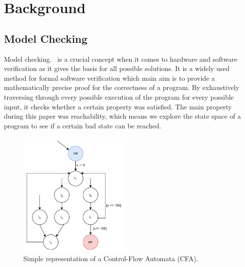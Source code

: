 \chapter{Background}

\section{Model Checking}




Model checking.~\cite{modelChecking} is a crucial concept when it comes to hardware and software verification as it gives the basis for all possible solutions. %
It is a widely used method for formal software verification  which main aim is to provide a mathematically precise proof for the correctness of a program. %
By exhaustively traversing through every possible execution of the program for every possible input, it checks whether a certain property was satisfied. %
The main property during this paper was reachability, which means we explore the state space of a program to see if a certain bad state can be reached.

\begin{figure}
  \centering
  \includegraphics[width=0.5\textwidth]{figures/cfa_simple.pdf}
  \caption{Simple representation of a Control-Flow Automata (CFA). }
  \label{fig:cfa}
\end{figure}

